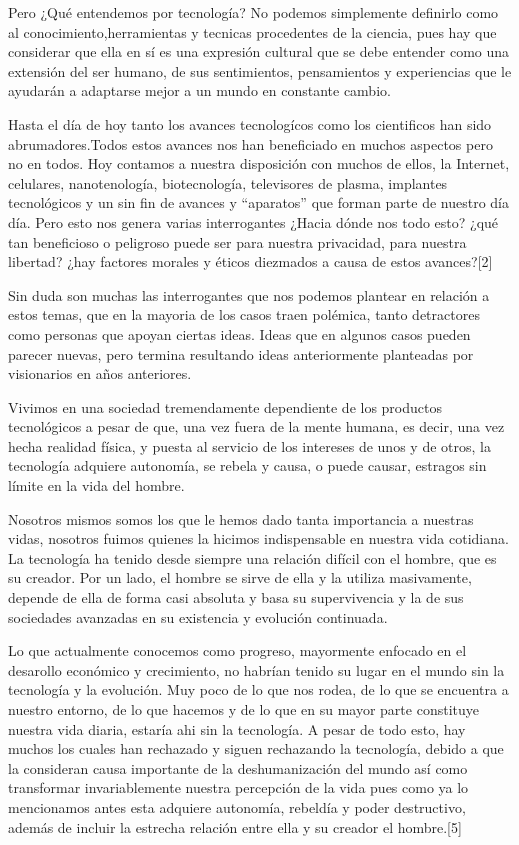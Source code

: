\documentclass{bmcart}
\begin{document}
Pero ¿Qué entendemos por tecnología? No podemos simplemente definirlo como al conocimiento,herramientas y tecnicas procedentes de la ciencia, pues hay que considerar que ella en sí es una expresión cultural que se debe entender como una extensión del ser humano, de sus sentimientos, pensamientos y experiencias que le ayudarán a adaptarse mejor a un mundo en constante cambio.\smallskip

Hasta el día de hoy tanto los avances tecnologícos como los cientificos han sido abrumadores.Todos estos avances nos han beneficiado en muchos aspectos pero no en todos. Hoy contamos a nuestra disposición con muchos de ellos, la Internet, celulares, nanotenología, biotecnología, televisores de plasma, implantes tecnológicos y un sin fin de avances y “aparatos” que forman parte de nuestro día día. Pero esto nos genera varias interrogantes ¿Hacia dónde nos todo esto? ¿qué tan beneficioso o peligroso puede ser para nuestra privacidad, para nuestra libertad? ¿hay factores morales y éticos diezmados a causa de estos avances?[2]\smallskip

Sin duda son muchas las interrogantes que nos podemos plantear en relación a estos temas, que en la mayoria de los casos traen polémica, tanto detractores como personas que apoyan ciertas ideas. Ideas que en algunos casos pueden parecer nuevas, pero termina resultando ideas anteriormente planteadas por visionarios en años anteriores.\smallskip

Vivimos en una sociedad tremendamente dependiente de los productos tecnológicos a pesar de que, una vez fuera de la mente humana, es decir, una vez hecha realidad física, y puesta al servicio de los intereses de unos y de otros, la tecnología adquiere autonomía, se rebela y causa, o puede causar, estragos sin límite en la vida del hombre.\smallskip

Nosotros mismos somos los que le hemos dado tanta importancia a nuestras vidas, nosotros fuimos quienes la hicimos indispensable en nuestra vida cotidiana. La tecnología ha tenido desde siempre una relación difícil con el hombre, que es su creador. Por un lado, el hombre se sirve de ella y la utiliza masivamente, depende de ella de forma casi absoluta y basa su supervivencia y la de sus sociedades avanzadas en su existencia y evolución continuada. \smallskip

Lo que actualmente conocemos como progreso, mayormente enfocado en el desarollo económico y crecimiento, no habrían tenido su lugar en el mundo sin la tecnología y la evolución. Muy poco de lo que nos rodea, de lo que se encuentra a nuestro entorno, de lo que hacemos y de lo que en su mayor parte constituye nuestra vida diaria, estaría ahi sin la tecnología. A pesar de todo esto, hay muchos los cuales han rechazado y siguen rechazando la tecnología, debido a que la consideran causa importante de la deshumanización del mundo así como transformar invariablemente nuestra percepción de la vida pues como ya lo mencionamos antes esta adquiere autonomía, rebeldía y poder destructivo, además de incluir la estrecha relación entre ella y su creador el hombre.[5]\smallskip
\end{document}
